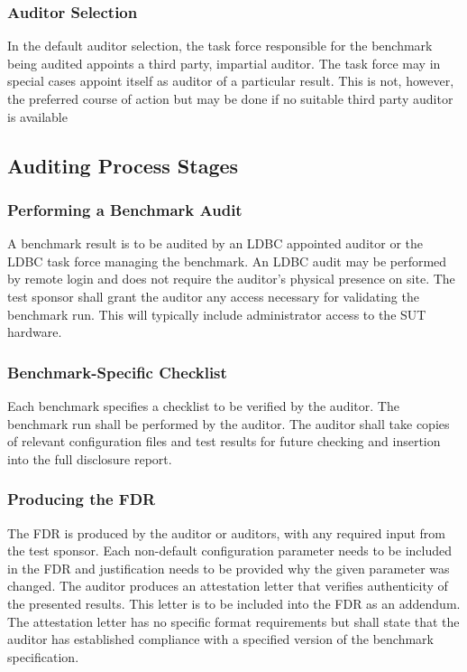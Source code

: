 \subsubsection{Auditor Selection}
In the default auditor selection, the task force responsible for the benchmark being audited appoints a third party, impartial auditor. The task force may in special cases appoint itself as auditor of a particular result. This is not, however, the preferred course of action but may be done if no suitable third party auditor is available


\subsection{Auditing Process Stages}
\subsubsection{Performing a Benchmark Audit}
A benchmark result is to be audited by an LDBC appointed auditor or the LDBC task force managing the benchmark. An LDBC audit may be performed by remote login and does not require the auditor's physical presence on site. The test sponsor shall grant the auditor any access necessary for validating the benchmark run. This will typically include administrator access to the SUT hardware.

\subsubsection{Benchmark-Specific Checklist}
Each benchmark specifies a checklist to be verified by the auditor. The benchmark run shall be performed by the auditor. The auditor shall take copies of relevant configuration files and test results for future checking and insertion into the full disclosure report.

\subsubsection{Producing the FDR}
The FDR is produced by the auditor or auditors, with any required input from the test sponsor. Each non-default configuration parameter needs to be included in the FDR and justification needs to be provided why the given parameter was changed.
The auditor produces an attestation letter that verifies authenticity of the presented results. This letter is to be included into the FDR as an addendum. The attestation letter has no specific format requirements but shall state that the auditor has established compliance with a specified version of the benchmark specification.

